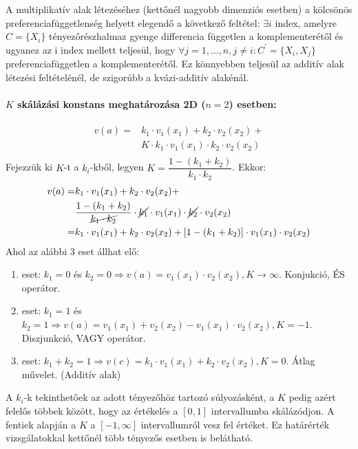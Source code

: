 \documentclass[a4paper,12pt]{article}
\begin{document}
A multiplikatív alak létezéséhez (kettőnél nagyobb dimenziós esetben) a kölcsönös preferenciafüggetlenség helyett elegendő a következő feltétel: $\exists i$ index, amelyre $C=\{X_i\}$ tényezőrészhalmaz gyenge differencia független a komplementerétől és ugyanez az i index mellett teljesül, hogy $\forall j=1,...,n , j \neq i : C^{'}=\{X_i, X_j\}$ preferenciafüggetlen a komplementerétől. Ez könnyebben teljesül az additív alak létezési feltételénél, de szigorúbb a kvázi-additív alakénál.

\paragraph{$K$ skálázási konstans meghatározása 2D ($n=2$) esetben:}
\begin{equation}
\begin{split}
v(a) = & k_1\cdot v_1(x_1) + k_2\cdot v_2(x_2)+ \\
&K\cdot  k_{1}\cdot v_1(x_1)\cdot k_{2}\cdot v_2(x_2) \\
\end{split}
\end{equation}
Fejezzük ki $K$-t a $k_i$-kből, legyen $K = \dfrac{1 - (k_1 + k_2)}{k_1\cdot k_2}$. Ekkor:
\begin{equation}
\begin{split}
v(a) = & k_1\cdot v_1(x_1) + k_2\cdot v_2(x_2)+ \\
&\dfrac{1 - (k_1 + k_2)}{ \cancel{k_1\cdot k_2} } \cdot   \cancel{k_{1}}\cdot v_1(x_1)\cdot  \cancel{k_{2}}\cdot v_2(x_2) \\
= & k_1\cdot v_1(x_1) + k_2\cdot v_2(x_2)+ [1 - (k_1 + k_2)]\cdot v_1(x_1)\cdot v_2(x_2) \\
\end{split}
\end{equation}
Ahol az alábbi 3 eset állhat elő:
\begin{enumerate}
\item eset: $k_1 = 0$ és $k_2 = 0 \Rightarrow v(a) = v_1(x_1) \cdot  v_2(x_2), K \rightarrow \infty$. Konjukció, ÉS operátor. 
\item eset: $k_1 = 1$ és $k_2 = 1 \Rightarrow v(a) = v_1(x_1) + v_2(x_2) - v_1(x_1)\cdot  v_2(x_2), K = -1$. Diszjunkció, VAGY operátor.  
\item eset: $k_1 + k_2 = 1 \Rightarrow v(c) = k_1\cdot v_1(x_1) + k_2\cdot v_2(x_2), K = 0 $. Átlag művelet. (Additív alak)
\end{enumerate} 

A $k_i$-k tekinthetőek az adott tényezőhöz tartozó súlyozásként, a $K$ pedig azért felelős többek között, hogy az értékelés a $[0,1]$ intervallumba skálázódjon. A fentiek alapján a $K$ a $[-1, \infty]$ intervallumról vesz fel értéket. Ez határérték vizsgálatokkal kettőnél több tényezős esetben is belátható.
\end{document}
